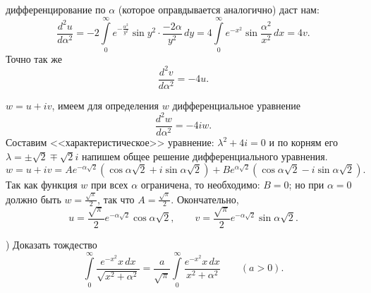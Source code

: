 \documentclass[12pt,a4paper]{book}
\begin{document}
 дифференцирование по $\alpha$ (которое оправдывается аналогично) даст нам:
\[\frac{d^2 u}{d\alpha^2} = -2 \int\limits_0^\infty{e^{-\frac{\alpha^2}{y^2}}\sin{y^2}\cdot\frac{-2\alpha}{y^2}}\,dy = 4\int\limits_0^\infty{e^{-x^2}\sin{\frac{\alpha^2}{x^2}}}\,dx=4v.\]
Точно так же
\[\frac{d^2 v}{d\alpha^2}=-4u.\]

 $w=u+iv$, имеем для определения $w$ дифференциальное уравнение
\[\frac{d^2 w}{d\alpha^2}=-4iw.\]
Составим <<характеристическое>> уравнение: $\lambda^2 + 4i=0$ и по корням его $\lambda=\pm\sqrt{2}\mp\sqrt{2}i$ напишем общее решение дифференциального уравнения.
\[w=u+iv=Ae^{-\alpha\sqrt{2}}(\cos{\alpha\sqrt{2}} + i\sin{\alpha\sqrt{2}}) + Be^{\alpha\sqrt{2}}(\cos{\alpha\sqrt{2}} - i\sin{\alpha\sqrt{2}}).\]
Так как функция $w$ при всех $\alpha$ ограничена, то необходимо: $B=0$; но при $\alpha=0$ должно быть $w=\frac{\sqrt{\pi}}{2}$, так что $A=\frac{\sqrt{\pi}}{2}$. Окончательно,
\[u=\frac{\sqrt{\pi}}{2}e^{-\alpha\sqrt{2}}\cos{\alpha\sqrt{2}},\qquad v=\frac{\sqrt{\pi}}{2}e^{-\alpha\sqrt{2}}\sin{\alpha\sqrt{2}}.\]

) Доказать тождество
\[\int\limits_0^\infty{\frac{e^{-{x^2}}x\,dx}{\sqrt{x^{2}+\alpha^{2}}}} = \frac{a}{\sqrt{\pi}}\int\limits_0^\infty{\frac{e^{-{x^2}}x\,dx}{x^{2}+\alpha^{2}}}\qquad(a>0).\]
\
\end{document}
